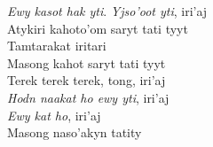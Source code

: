 \begin{linenumbers}
\emph{Ewy kasot hak yti}.  \emph{Yjso'oot yti}, iri'aj\\
Atykiri kahoto'om saryt tati tyyt\\
Tamtarakat iritari\\
Masong kahot saryt tati tyyt\\
Terek terek terek, tong, iri'aj\\
\emph{Hodn naakat ho ewy yti}, iri'aj\\
\emph{Ewy kat ho}, iri'aj\\
Masong naso'akyn tatity

\end{linenumbers}\endgroup

\bigskip

